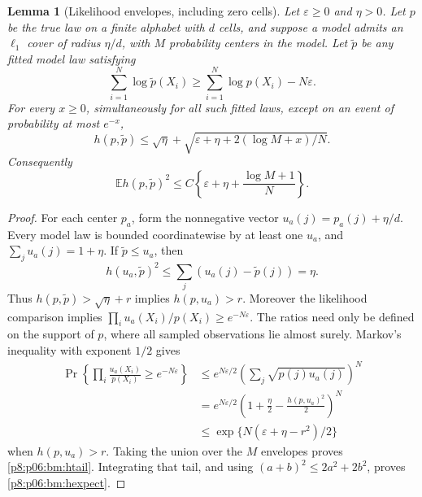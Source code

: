 \documentclass[11pt,a4paper]{article}
\newtheorem{lemma}[theorem]{Lemma}
\theoremstyle{definition}
\theoremstyle{remark}
\numberwithin{equation}{section}
\begin{document}
\begin{lemma}[Likelihood envelopes, including zero cells]
\label{p8:p06:bm:envelopes}
Let $\varepsilon\ge0$ and $\eta>0$. Let $p$ be the true law on a finite alphabet with $d$ cells, and suppose a
model admits an $\ell_1$ cover of radius $\eta/d$, with $M$ probability
centers in the model. Let $\widetilde p$ be any fitted model law satisfying
\[
 \sum_{i=1}^N\log\widetilde p(X_i)
 \ge\sum_{i=1}^N\log p(X_i)-N\varepsilon.
\]
For every $x\ge0$, simultaneously for all such fitted laws, except on an
event of probability at most $e^{-x}$,
\begin{equation}\label{p8:p06:bm:htail}
 h(p,\widetilde p)
 \le\sqrt\eta+
       \sqrt{\varepsilon+\eta+2(\log M+x)/N}.
\end{equation}
Consequently
\begin{equation}\label{p8:p06:bm:hexpect}
 \mathbb E h(p,\widetilde p)^2
 \le C\left\{\varepsilon+\eta+\frac{\log M+1}{N}\right\}.
\end{equation}
\end{lemma}
\begin{proof}
For each center $p_a$, form the nonnegative vector
$u_a(j)=p_a(j)+\eta/d$. Every model law is bounded coordinatewise by at
least one $u_a$, and $\sum_j u_a(j)=1+\eta$. If $\widetilde p\le u_a$,
then
\[
 h(u_a,\widetilde p)^2\le\sum_j(u_a(j)-\widetilde p(j))=\eta.
\]
Thus $h(p,\widetilde p)>\sqrt\eta+r$ implies $h(p,u_a)>r$.
Moreover the likelihood comparison implies
$\prod_i u_a(X_i)/p(X_i)\ge e^{-N\varepsilon}$.
The ratios need only be defined on the support of $p$, where all sampled
observations lie almost surely. Markov's inequality with exponent $1/2$
gives
\begin{align*}
 \Pr\left\{\prod_i\frac{u_a(X_i)}{p(X_i)}
                      \ge e^{-N\varepsilon}\right\}
 &\le e^{N\varepsilon/2}
        \left(\sum_j\sqrt{p(j)u_a(j)}\right)^N\\
 &=e^{N\varepsilon/2}
        \left(1+\frac\eta2-\frac{h(p,u_a)^2}{2}\right)^N\\
 &\le\exp\{N(\varepsilon+\eta-r^2)/2\}
\end{align*}
when $h(p,u_a)>r$. Taking the union over the $M$ envelopes proves
\eqref{p8:p06:bm:htail}. Integrating that tail, and using
$(a+b)^2\le2a^2+2b^2$, proves \eqref{p8:p06:bm:hexpect}.
\end{proof}
\end{document}
